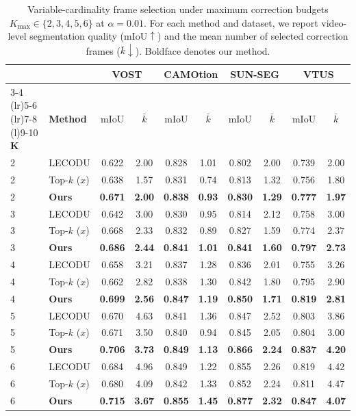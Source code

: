 \begin{table}[t]
\caption{Variable-cardinality frame selection under maximum correction budgets
\(K_{\max}\in\{2,3,4,5,6\}\) at \(\alpha=0.01\). For each method and dataset,
we report video-level segmentation quality (\(\mathrm{mIoU}\uparrow\)) and the
mean number of selected correction frames (\(\bar{k}\downarrow\)). Boldface
denotes our method.}
\label{tab:app_variable_cardinality}

\centering
\small
\setlength{\tabcolsep}{3.2pt}
\begin{tabular}{@{}llcccccccc@{}}
\toprule
& & \multicolumn{2}{c}{\textbf{VOST}} & \multicolumn{2}{c}{\textbf{CAMOtion}} & \multicolumn{2}{c}{\textbf{SUN-SEG}} & \multicolumn{2}{c}{\textbf{VTUS}} \\
\cmidrule(lr){3-4} \cmidrule(lr){5-6} \cmidrule(lr){7-8} \cmidrule(l){9-10}
\textbf{K} & \textbf{Method} & mIoU & $\bar{k}$ & mIoU & $\bar{k}$ & mIoU & $\bar{k}$ & mIoU & $\bar{k}$ \\
\midrule

2 & LECODU & 0.622 & 2.00 & 0.828 & 1.01 & 0.802 & 2.00 & 0.739 & 2.00 \\
2 & Top-\(k\) (\(x\)) & 0.638 & 1.57 & 0.831 & 0.74 & 0.813 & 1.32 & 0.756 & 1.80 \\
2 & \textbf{Ours} & \textbf{0.671} & \textbf{2.00} & \textbf{0.838} & \textbf{0.93} & \textbf{0.830} & \textbf{1.29} & \textbf{0.777} & \textbf{1.97} \\
\midrule
3 & LECODU & 0.642 & 3.00 & 0.830 & 0.95 & 0.814 & 2.12 & 0.758 & 3.00 \\
3 & Top-\(k\) (\(x\)) & 0.668 & 2.33 & 0.832 & 0.89 & 0.827 & 1.59 & 0.774 & 2.37 \\
3 & \textbf{Ours} & \textbf{0.686} & \textbf{2.44} & \textbf{0.841} & \textbf{1.01} & \textbf{0.841} & \textbf{1.60} & \textbf{0.797} & \textbf{2.73} \\
\midrule
4 & LECODU & 0.658 & 3.21 & 0.837 & 1.28 & 0.836 & 2.01 & 0.755 & 3.26 \\
4 & Top-\(k\) (\(x\)) & 0.662 & 2.82 & 0.838 & 1.30 & 0.842 & 1.80 & 0.795 & 2.90 \\
4 & \textbf{Ours} & \textbf{0.699} & \textbf{2.56} & \textbf{0.847} & \textbf{1.19} & \textbf{0.850} & \textbf{1.71} & \textbf{0.819} & \textbf{2.81} \\
\midrule
5 & LECODU & 0.670 & 4.63 & 0.841 & 1.36 & 0.847 & 2.52 & 0.803 & 3.86 \\
5 & Top-\(k\) (\(x\)) & 0.671 & 3.50 & 0.840 & 0.94 & 0.845 & 2.05 & 0.804 & 3.00 \\
5 & \textbf{Ours} & \textbf{0.706} & \textbf{3.73} & \textbf{0.849} & \textbf{1.13} & \textbf{0.866} & \textbf{2.24} & \textbf{0.837} & \textbf{4.20} \\
\midrule
6 & LECODU & 0.684 & 4.96 & 0.849 & 1.22 & 0.855 & 2.26 & 0.819 & 4.42 \\
6 & Top-\(k\) (\(x\)) & 0.680 & 4.09 & 0.842 & 1.33 & 0.852 & 2.24 & 0.811 & 4.47 \\
6 & \textbf{Ours} & \textbf{0.715} & \textbf{3.67} & \textbf{0.855} & \textbf{1.45} & \textbf{0.877} & \textbf{2.32} & \textbf{0.847} & \textbf{4.07} \\
\bottomrule
\end{tabular}

\end{table}
